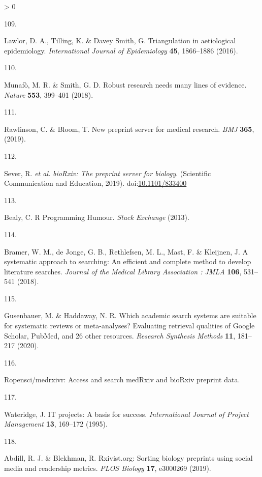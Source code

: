 \documentclass[a4paper, twoside]{templates/ociamthesis}
\newlength{\cslhangindent}
\newlength{\csllabelwidth}
\newenvironment{CSLReferences}[3] %
 {%
  \setlength{\parindent}{0pt}
  \ifodd #1 \everypar{\setlength{\hangindent}{\cslhangindent}}\ignorespaces\fi
  \ifnum #2 > 0
  \setlength{\parskip}{#2\baselineskip}
  \fi
 }%
 {}
\newcommand{\CSLLeftMargin}[1]{\parbox[t]{\maxof{\widthof{#1}}{\csllabelwidth}}{#1}}
\newcommand{\CSLRightInline}[1]{\parbox[t]{\linewidth - \csllabelwidth}{#1}}
\begin{document}
\begin{CSLReferences}{0}{0}
\leavevmode\hypertarget{ref-lawlor2016}{}%
\CSLLeftMargin{109. }
\CSLRightInline{Lawlor, D. A., Tilling, K. \& Davey Smith, G. Triangulation in aetiological epidemiology. \emph{International Journal of Epidemiology} \textbf{45}, 1866--1886 (2016).}

\leavevmode\hypertarget{ref-munafo2018}{}%
\CSLLeftMargin{110. }
\CSLRightInline{Munafò, M. R. \& Smith, G. D. Robust research needs many lines of evidence. \emph{Nature} \textbf{553}, 399--401 (2018).}

\leavevmode\hypertarget{ref-rawlinson2019}{}%
\CSLLeftMargin{111. }
\CSLRightInline{Rawlinson, C. \& Bloom, T. New preprint server for medical research. \emph{BMJ} \textbf{365}, (2019).}

\leavevmode\hypertarget{ref-sever2019}{}%
\CSLLeftMargin{112. }
\CSLRightInline{Sever, R. \emph{et al.} \emph{{bioRxiv}: The preprint server for biology}. ({Scientific Communication and Education}, 2019). doi:\href{https://doi.org/10.1101/833400}{10.1101/833400}}

\leavevmode\hypertarget{ref-beely2013}{}%
\CSLLeftMargin{113. }
\CSLRightInline{Bealy, C. R {Programming Humour}. \emph{Stack Exchange} (2013).}

\leavevmode\hypertarget{ref-bramer2018}{}%
\CSLLeftMargin{114. }
\CSLRightInline{Bramer, W. M., de Jonge, G. B., Rethlefsen, M. L., Mast, F. \& Kleijnen, J. A systematic approach to searching: An efficient and complete method to develop literature searches. \emph{Journal of the Medical Library Association : JMLA} \textbf{106}, 531--541 (2018).}

\leavevmode\hypertarget{ref-gusenbauer2020}{}%
\CSLLeftMargin{115. }
\CSLRightInline{Gusenbauer, M. \& Haddaway, N. R. Which academic search systems are suitable for systematic reviews or meta-analyses? Evaluating retrieval qualities of {Google Scholar}, {PubMed}, and 26 other resources. \emph{Research Synthesis Methods} \textbf{11}, 181--217 (2020).}

\leavevmode\hypertarget{ref-zotero-15029}{}%
\CSLLeftMargin{116. }
\CSLRightInline{Ropensci/medrxivr: Access and search {medRxiv} and {bioRxiv} preprint data.}

\leavevmode\hypertarget{ref-wateridge1995}{}%
\CSLLeftMargin{117. }
\CSLRightInline{Wateridge, J. {IT} projects: A basis for success. \emph{International Journal of Project Management} \textbf{13}, 169--172 (1995).}

\leavevmode\hypertarget{ref-abdill2019}{}%
\CSLLeftMargin{118. }
\CSLRightInline{Abdill, R. J. \& Blekhman, R. Rxivist.org: Sorting biology preprints using social media and readership metrics. \emph{PLOS Biology} \textbf{17}, e3000269 (2019).}


\end{CSLReferences}
\end{document}
